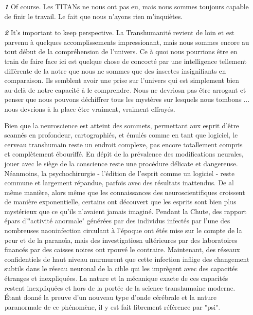 \textbf{\textit{1}} Of course. Les TITANs ne nous ont pas eu, mais nous sommes toujours capable de finir le travail. Le fait que nous n'ayons rien m'inquiètes. 

\textbf{\textit{2}} It’s important to keep perspective. La Transhumanité revient de loin et est parvenu à quelques accomplissements impressionant, mais nous sommes encore au tout début de la compréhension de l'univers. Ce à quoi nous pourrions être en train de faire face ici est quelque chose de concocté par une intelligence tellement différente de la notre que nous ne sommes que des insectes insignifiants en comparaison. Ils semblent avoir une prise sur l'univers qui est simplement bien au-delà de notre capacité à le comprendre. Nous ne devriosn pas être arrogant et penser que nous pouvons déchiffrer tous les mystères sur lesquels nous tombons ... nous devrions à la place être vraiment, vraiment effrayés. 

\newpage

Bien que la neuroscience est atteint des sommets, permettant aux esprit d'être scannés en profondeur, cartographiés, et émulés comme en tant que logiciel, le cerveau transhumain reste un endroit complexe, pas encore totallement compris et complètement ébouriffé. En dépit de la prévalence des modifications neurales, jouer avec le siège de la conscience reste une procédure délicate et dangereuse. Néanmoins, la psychochirurgie - l'édition de l'esprit comme un logiciel - reste commune et largement répandue, parfois avec des résultats inattendus. De al même manière, alors même que les connaissances des neuroscientifiques croissent de manière exponentielle, certains ont découvert que les esprits sont bien plus mystérieux que ce qu'ils n'avaient jamais imaginé. Pendant la Chute, des rapport épars d'"activité anormale" générées par des individus infectés par l'une des nombreuses naoninfection circulant à l'époque ont étés mise sur le compte de la peur et de la paranoïa, mais des investigatiosn ultérieures par des laboratoires financés par des caisses noires ont rpouvé le contraire. Maintenant, des réseaux confidentiels de haut niveau murmurent que cette infection inflige des changement subtils dans le réseau neuronal de la cible qui les imprègent avec des capacités étranges et inexpliquées. La nature et la mécanique exacte de ces capacités restent inexpliquées et hors de la portée de la science transhumaine moderne. Étant donné la preuve d'un nouveau type d'onde cérébrale et la nature paranormale de ce phénomène, il y est fait librement référence par "psi". 

